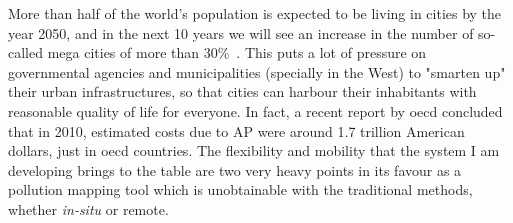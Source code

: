 More than half of the world's population is expected to be living in
cities by the year 2050, and in the next 10 years we will see an
increase in the number of so-called mega cities of more than
30\%~\cite{CABI2019}. This puts a lot of pressure on governmental
agencies and municipalities (specially in the West) to "smarten up"
their urban infrastructures, so that cities can harbour their
inhabitants with reasonable quality of life for everyone. In fact, a
recent report by \gls{oecd} concluded that in 2010, estimated costs due
to \gls{AP} were around 1.7 trillion American dollars, just in
\gls{oecd} countries.  The flexibility and mobility that the system I am
developing brings to the table are two very heavy points in its favour
as a pollution mapping tool which is unobtainable with the traditional
methods, whether \emph{in-situ} or remote.
